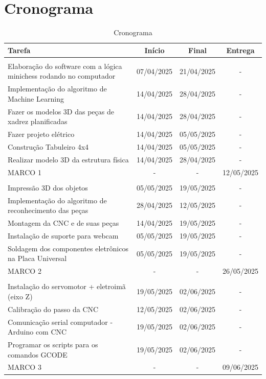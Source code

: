 \documentclass[a4paper,12pt]{article}
\begin{document}
\section{Cronograma}  

\begin{table}[H]
\centering
\caption{Cronograma}
\label{tab:cronograma}
\renewcommand{\arraystretch}{1.5}
\begin{tabularx}{\textwidth}{Yccc}
\toprule
{}
\textbf{Tarefa} & \textbf{Início} & \textbf{Final} & \textbf{Entrega} \\
\midrule

 \\
Elaboração do software com a lógica minichess rodando no computador & 07/04/2025 & 21/04/2025 & - \\
Implementação do algoritmo de Machine Learning & 14/04/2025 & 28/04/2025 & - \\
Fazer os modelos 3D das peças de xadrez planificadas & 14/04/2025 & 28/04/2025 & - \\
Fazer projeto elétrico & 14/04/2025 & 05/05/2025 & - \\
Construção Tabuleiro 4x4 & 14/04/2025 & 05/05/2025 & - \\
Realizar modelo 3D da estrutura física & 14/04/2025 & 28/04/2025 & - \\
MARCO 1 & - & - & 12/05/2025 \\

 \\
Impressão 3D dos objetos & 05/05/2025 & 19/05/2025 & - \\
Implementação do algoritmo de reconhecimento das peças & 28/04/2025 & 12/05/2025 & - \\
Montagem da CNC e de suas peças & 14/04/2025 & 19/05/2025 & - \\
Instalação de suporte para webcam & 05/05/2025 & 19/05/2025 & - \\
Soldagem dos componentes eletrônicos na Placa Universal & 05/05/2025 & 19/05/2025 & - \\
MARCO 2 & - & - & 26/05/2025 \\

 \\
Instalação do servomotor + eletroimã (eixo Z) & 19/05/2025 & 02/06/2025 & - \\
Calibração do passo da CNC & 12/05/2025 & 02/06/2025 & - \\
Comunicação serial computador - Arduino com CNC & 19/05/2025 & 02/06/2025 & - \\
Programar os scripts para os comandos GCODE & 19/05/2025 & 02/06/2025 & - \\
MARCO 3 & - & - & 09/06/2025 \\

\bottomrule
\end{tabularx}

\end{table}
\end{document}
